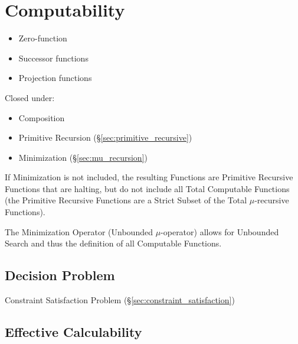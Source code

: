 \section{Computability}\label{sec:computability}

\begin{itemize}
\item Zero-function
\item Successor functions
\item Projection functions
\end{itemize}

Closed under:

\begin{itemize}
\item Composition
\item Primitive Recursion (\S\ref{sec:primitive_recursive})
\item Minimization (\S\ref{sec:mu_recursion})
\end{itemize}

If Minimization is not included, the resulting Functions are Primitive
Recursive Functions that are halting, but do not include all Total
Computable Functions (the Primitive Recursive Functions are a Strict
Subset of the Total $\mu$-recursive Functions).

The Minimization Operator (Unbounded $\mu$-operator) allows for
Unbounded Search and thus the definition of all Computable Functions.



\subsection{Decision Problem}\label{sec:decision_problem}

\fist Constraint Satisfaction Problem
(\S\ref{sec:constraint_satisfaction})



\subsection{Effective Calculability}\label{sec:effective_method}

